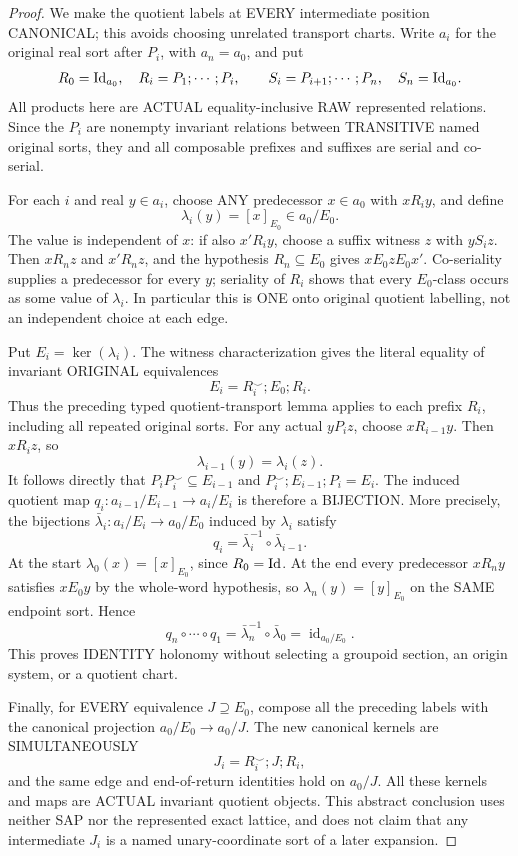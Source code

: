 \begin{proof}
We make the quotient labels at EVERY intermediate position
CANONICAL; this avoids choosing unrelated transport charts.
Write \(a_i\) for the original real sort after \(P_i\),
with \(a_n=a_0\), and put
\[
 R_0=\mathrm{Id}_{a_0},\quad
 R_i=P_1;\cdots;P_i,\qquad
 S_i=P_{i+1};\cdots;P_n,\quad S_n=\mathrm{Id}_{a_0}.
\]
All products here are ACTUAL equality-inclusive RAW represented
relations. Since the \(P_i\) are nonempty invariant relations between
TRANSITIVE named original sorts, they and all composable prefixes
and suffixes are serial and co-serial.

For each \(i\) and real \(y\in a_i\), choose ANY predecessor
\(x\in a_0\) with \(xR_i y\), and define
\[
             \lambda_i(y)=[x]_{E_0}\in a_0/E_0.
\]
The value is independent of \(x\): if also \(x'R_i y\),
choose a suffix witness \(z\) with \(yS_i z\).
Then \(xR_nz\) and \(x'R_nz\), and the hypothesis
\(R_n\subseteq E_0\) gives \(xE_0zE_0x'\).
Co-seriality supplies a predecessor for every \(y\);
seriality of \(R_i\) shows that every \(E_0\)-class
occurs as some value of \(\lambda_i\).
In particular this is ONE onto original quotient labelling,
not an independent choice at each edge.

Put \(E_i=\ker(\lambda_i)\). The witness characterization
gives the literal equality of invariant ORIGINAL equivalences
\[
                 E_i=R_i^{\smile};E_0;R_i .
\]
Thus the preceding typed quotient-transport lemma applies to
each prefix \(R_i\), including all repeated original sorts.
For any actual \(yP_i z\), choose \(xR_{i-1}y\).
Then \(xR_i z\), so
\[
                   \lambda_{i-1}(y)=\lambda_i(z).
\]
It follows directly that \(P_iP_i^{\smile}\subseteq E_{i-1}\)
and \(P_i^{\smile};E_{i-1};P_i=E_i\).
The induced quotient map
\(q_i:a_{i-1}/E_{i-1}\to a_i/E_i\)
is therefore a BIJECTION.  More precisely, the
bijections \(\bar\lambda_i:a_i/E_i\to a_0/E_0\)
induced by \(\lambda_i\) satisfy
\[
           q_i=\bar\lambda_i^{-1}\circ\bar\lambda_{i-1}.
\]
At the start \(\lambda_0(x)=[x]_{E_0}\), since \(R_0=\mathrm{Id}\).
At the end every predecessor \(xR_ny\) satisfies
\(xE_0y\) by the whole-word hypothesis, so
\(\lambda_n(y)=[y]_{E_0}\) on the SAME endpoint sort.
Hence
\[
            q_n\circ\cdots\circ q_1
               =\bar\lambda_n^{-1}\circ\bar\lambda_0
               =\operatorname{id}_{a_0/E_0}.
\]
This proves IDENTITY holonomy without selecting a
groupoid section, an origin system, or a quotient chart.

Finally, for EVERY equivalence \(J\supseteq E_0\),
compose all the preceding labels with the canonical
projection \(a_0/E_0\to a_0/J\).
The new canonical kernels are SIMULTANEOUSLY
\[
              J_i=R_i^{\smile};J;R_i,
\]
and the same edge and end-of-return identities hold on
\(a_0/J\).
All these kernels and maps are ACTUAL invariant quotient objects.
This abstract conclusion uses neither SAP nor the represented exact
lattice, and does not claim that any intermediate \(J_i\) is a
named unary-coordinate sort of a later expansion.
\end{proof}

